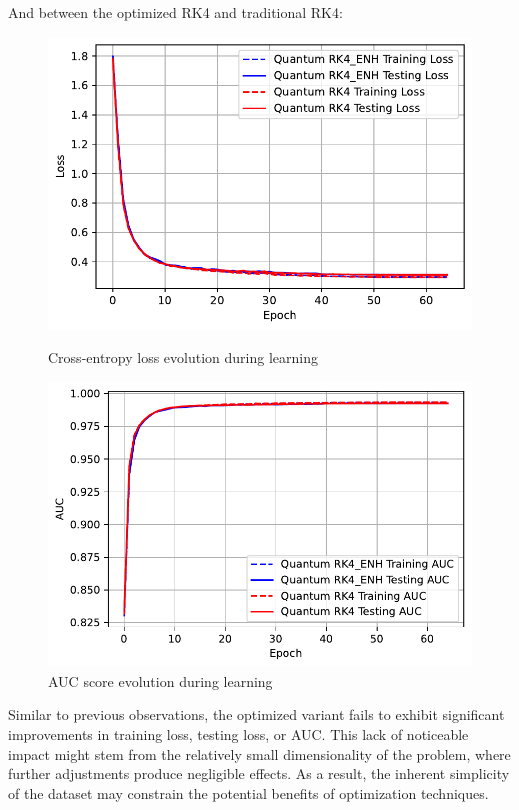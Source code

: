 \documentclass[12pt,a4paper]{report}
\begin{document}
And between the optimized RK4 and traditional RK4:

\begin{figure}[th]
  \centering
  \includegraphics[scale=0.88]{./pics/new_pdf_graphs/quantum/3_rk_1_dec/quantum_transfomer_loss_mnist_rk4_rk4_enh.pdf}
  \caption[Cross-entropy loss evolution during learning]{Cross-entropy loss evolution during learning}
  \label{fig:p24}
  \vspace*{\floatsep}
  \centering
  \includegraphics[scale=0.88]{./pics/new_pdf_graphs/quantum/3_rk_1_dec/quantum_transfomer_auc_mnist_rk4_rk4_enh.pdf}
  \caption[AUC score evolution during learning]{AUC score evolution during learning}
  \label{fig:p25}
\end{figure}


Similar to previous observations, the optimized variant fails to exhibit significant improvements in training loss, testing loss, or AUC. This lack of noticeable impact might stem from the relatively small dimensionality of the problem, where further adjustments produce negligible effects. As a result, the inherent simplicity of the dataset may constrain the potential benefits of optimization techniques.
\clearpage
\end{document}
